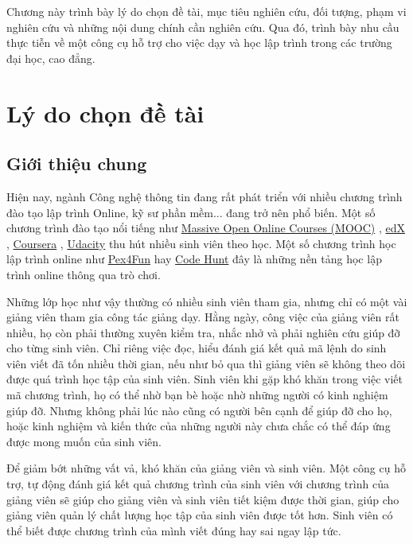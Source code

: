 Chương này trình bày lý do chọn đề tài, mục tiêu nghiên cứu, đối tượng, phạm vi nghiên cứu và những nội dung chính cần nghiên cứu. Qua đó, trình bày nhu cầu thực tiễn về một công cụ hỗ trợ cho việc dạy và học lập trình trong các trường đại học, cao đẳng.

\section{Lý do chọn đề tài}

\subsection{Giới thiệu chung}

Hiện nay, ngành Công nghệ thông tin đang rất phát triển với nhiều chương trình đào tạo lập trình Online, kỹ sư phần mềm... đang trở nên phổ biến. Một số chương trình đào tạo nổi tiếng như \href{https://www.coursera.org/course/saas}{Massive Open Online Courses (MOOC)} \cite{mooc}, \href{https://www.edx.org/}{edX} \cite{edx}, \href{https://www.coursera.org/}{Coursera} \cite{coursera}, \href{http://www.udacity.com/}{Udacity} \cite{Udacity} thu hút nhiều sinh viên theo học. Một số chương trình học lập trình online như \href{https://www.pexforfun.com/}{Pex4Fun} \cite{Pex4Fun} hay \href{https://www.microsoft.com/en-us/research/project/code-hunt/}{Code Hunt} \cite{CodeHunt} đây là những nền tảng học lập trình online thông qua trò chơi. 

Những lớp học như vậy thường có nhiều sinh viên tham gia, nhưng chỉ có một vài giảng viên tham gia công tác giảng dạy. Hằng ngày, công việc của giảng viên rất nhiều, họ còn phải thường xuyên kiểm tra, nhắc nhở và phải nghiên cứu giúp đỡ cho từng sinh viên. Chỉ riêng việc đọc, hiểu đánh giá kết quả mã lệnh do sinh viên viết đã tốn nhiều thời gian, nếu như bỏ qua thì giảng viên sẽ không theo dõi được quá trình học tập của sinh viên. Sinh viên khi gặp khó khăn trong việc viết mã chương trình, họ có thể nhờ bạn bè hoặc nhờ những người có kinh nghiệm giúp đỡ. Nhưng không phải lúc nào cũng có người bên cạnh để giúp đỡ cho họ, hoặc kinh nghiệm và kiến thức của những người này chưa chắc có thể đáp ứng được mong muốn của sinh viên.

Để giảm bớt những vất vả, khó khăn của giảng viên và sinh viên. Một công cụ hỗ trợ, tự động đánh giá kết quả chương trình của sinh viên với chương trình của giảng viên sẽ giúp cho giảng viên và sinh viên tiết kiệm được thời gian, giúp cho giảng viên quản lý chất lượng học tập của sinh viên được tốt hơn. Sinh viên có thể biết được chương trình của mình viết đúng hay sai ngay lập tức. 

